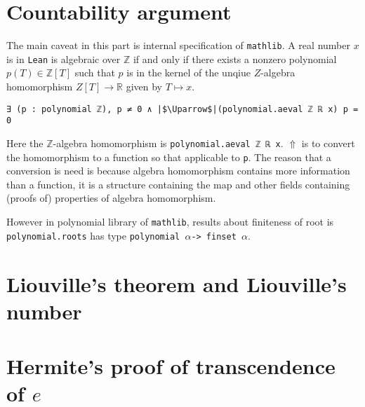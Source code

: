 \documentclass{report}
\theoremstyle{definition}
\theoremstyle{plain}
\begin{document}
\section{Countability argument}\label{fmlsn:count}
The main caveat in this part is internal specification of {\tt mathlib}. 
A real number $x$ is in {\tt Lean} is algebraic over $\mathbb Z$ if and only if there exists a nonzero polynomial $p(T)\in\mathbb Z[T]$ such that $p$ is in the kernel of the unqiue $Z$-algebra homomorphism $Z[T]\to\mathbb R$ given by $T\mapsto x$.
\begin{verbatim}
∃ (p : polynomial ℤ), p ≠ 0 ∧ |$\Uparrow$|(polynomial.aeval ℤ ℝ x) p = 0
\end{verbatim}
Here the $\mathbb Z$-algebra homomorphism is {\tt polynomial.aeval ℤ ℝ x}. $\Uparrow$ is to convert the homomorphism to a function so that applicable to {\tt p}. The reason that a conversion is need is because algebra homomorphism contains more information than a function, it is a structure containing the map and other fields containing (proofs of) properties of algebra homomorphism.

However in polynomial library of {\tt mathlib}, results about finiteness of root is {\tt polynomial.roots} has type {\tt polynomial $\alpha$-> finset $\alpha$}.


\section{Liouville's theorem and Liouville's number}\label{fmlsn:li}
\section{Hermite's proof of transcendence of $e$}\label{fmlsn:e}



%
\nocite{*}
\printbibliography[heading=bibintoc]

\end{document}
